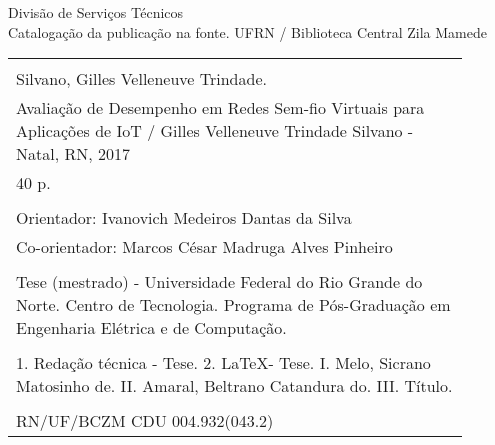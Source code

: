 %
%

\newpage

\begin{center}

\vspace*{\fill}

Divisão de Serviços Técnicos\\[1ex]
Catalogação da publicação na fonte.
UFRN / Biblioteca Central Zila Mamede

\vspace{2ex}

\begin{tabular}{|p{0.9\linewidth}|} \hline
\\
Silvano, Gilles Velleneuve Trindade. \\
\hspace{1em} Avaliação de Desempenho em Redes Sem-fio Virtuais para Aplicações de IoT /
Gilles Velleneuve Trindade Silvano - Natal, RN, 2017 \\
\hspace{1em} 40 p. \\
\\
\hspace{1em} Orientador: Ivanovich Medeiros Dantas da Silva \\
\hspace{1em} Co-orientador: Marcos César Madruga Alves Pinheiro \\
\\
\hspace{1em} Tese (mestrado) - Universidade Federal do Rio Grande do Norte.
Centro de Tecnologia. Programa de Pós-Graduação em Engenharia Elétrica e de Computação. \\
\\
\hspace{1em} 1. Redação técnica - Tese. 2. \LaTeX - Tese.
I. Melo, Sicrano Matosinho de. II. Amaral, Beltrano Catandura do.
III. Título. \\
\\
RN/UF/BCZM \hfill CDU 004.932(043.2) \\ \hline
\end{tabular} 

\end{center}
